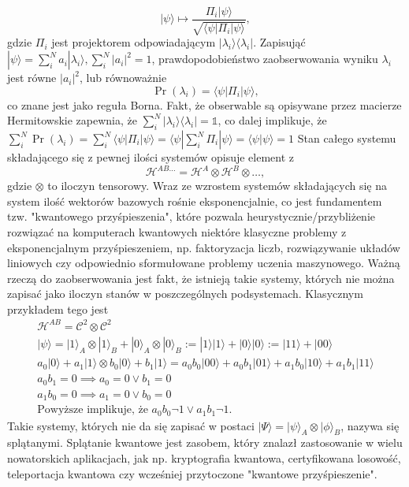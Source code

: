 \documentclass[10pt]{article} %
\newcommand{\Hx}[1]{\mathcal{H}^{#1}}
\newcommand{\Pro}[1]{\Pr(#1)}
\newcommand{\Ket}[1]{|#1\rangle}
\newcommand{\Bra}[1]{\langle#1|}
\newcommand{\Braket}[1]{\langle#1\rangle}
\newcommand{\KP}{\Ket{\psi}}
\newcommand{\BP}{\Bra{\psi}}
\begin{document}
\begin{equation}
\label{eq:cond_ev}
\Ket{\psi} \mapsto \frac{\Pi_i\Ket{\psi}}{\sqrt{\Bra{\psi}\Pi_i \Ket{\psi}}},
\end{equation}
gdzie $\Pi_i$ jest projektorem odpowiadającym $\Ket{\lambda_i}\Bra{\lambda_i}$. Zapisująć $\KP = \sum^N_i a_i \Ket{\lambda_i}, \sum^N_i |a_i|^2=1$, prawdopodobieństwo zaobserwowania wyniku $\lambda_i$ jest równe $|a_i|^2$, lub równoważnie
\begin{equation}
\Pro{\lambda_i} = \BP \Pi_i \KP,
\end{equation}
co znane jest jako reguła Borna. Fakt, że obserwable są opisywane przez macierze Hermitowskie zapewnia, że $\sum^N_i \Ket{\lambda_i}\Bra{\lambda_i} = \mathbb{1}$, co dalej implikuje, że $\sum^N_i \Pro{\lambda_i} = \sum^N_i \BP \Pi_i \KP = \BP \sum^N_i \Pi_i \KP = \Braket{\psi | \psi} = 1$
Stan całego systemu składającego się z pewnej ilości systemów opisuje element z
\begin{equation}
\Hx{AB\dots} = \Hx{A} \otimes \Hx{B} \otimes \dots,
\end{equation}
gdzie $\otimes$ to iloczyn tensorowy. Wraz ze wzrostem systemów składających się na system ilość wektorów bazowych rośnie eksponencjalnie, co jest fundamentem tzw. "kwantowego przyśpieszenia", które pozwala heurystycznie/przybliżenie rozwiązać na komputerach kwantowych niektóre klasyczne problemy z eksponencjalnym przyśpieszeniem,
np. faktoryzacja liczb, rozwiązywanie układów liniowych czy odpowiednio sformułowane problemy uczenia maszynowego.
Ważną rzeczą do zaobserwowania jest fakt, że istnieją takie systemy, których nie można zapisać jako iloczyn stanów w poszczególnych podsystemach. Klasycznym przykładem tego jest
\begin{gather*}
\Hx{AB} = \mathcal{C}^2 \otimes \mathcal{C}^2 \\
\KP = \Ket{1}_A \otimes \Ket{1}_B + \Ket{0}_A \otimes \Ket{0}_B := \Ket{1}\Ket{1} + \Ket{0}\Ket{0} := \Ket{11} + \Ket{00} \\
a_0\Ket{0} + a_1\Ket{1} \otimes b_0\Ket{0} + b_1\Ket{1} = a_0b_0 \Ket{00} + a_0b_1\Ket{01} + a_1b_0\Ket{10} + a_1b_1\Ket{11} \\
a_0b_1 = 0\implies a_0 = 0\vee b_1 = 0 \\
a_1b_0 = 0\implies a_1 = 0\vee b_0 = 0 \\
\text{Powyższe implikuje, że } a_0b_0 \neg 1 \vee a_1b_1 \neg 1.
\end{gather*} Takie systemy, których nie da się zapisać w postaci $\Ket{\Psi} = \Ket{\psi}_A \otimes \Ket{\phi}_B$, nazywa się splątanymi. Splątanie kwantowe jest zasobem, który znalazł zastosowanie w wielu nowatorskich aplikacjach, jak np. kryptografia kwantowa, certyfikowana losowość, teleportacja kwantowa czy wcześniej przytoczone "kwantowe przyśpieszenie".
\end{document}
